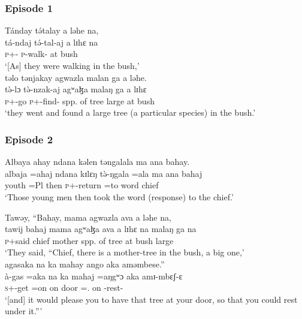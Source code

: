  \subsubsection*{Episode 1}
\ea      Tánday  t\'ətalay  a  ləhe  na,\\
\gll tá-ndaj        t\'ə-tal-aj    a   lɪhɛ     na\\
  \textsc{p}+{\IFV}-{\PRG}   \textsc{p}-walk{}-{\CL}   at  bush   {\PSP}\\
\glt ‘[As] they were walking in the bush,’\\
         
     \medskip
təlo  tənjakay  agwazla  malan  ga  a  ləhe.  \\
\gll t\`ə-lɔ           t\`ə-nzak-aj        agʷaɮa   malaŋ  ga      a    lɪhɛ\\
 \textsc{p}+{\PFV}-go   \textsc{p}+{\PFV}-find{}-{\CL}   {spp. of tree}     large   {\ADJ}  at   bush\\
\glt `they went and found a large tree (a particular species) in the bush.’
 \z
\subsubsection*{Episode 2}
\ea Albaya  ahay  ndana  kəlen  təngalala  ma  ana  bahay.  \\
\gll albaja  =ahaj  ndana  kɪlɛŋ  t\`ə-ŋgala        =ala     ma    ana      bahaj\\
          youth    =Pl       {\DEM}  then \textsc{p}+{\PFV}-return  =to  word    {\DAT} chief\\
        \glt ‘Those young men then took the word (response) to the chief.’  
 \z

\ea     Tawəy,  “Bahay,  mama  agwazla  ava  a  ləhe  na,   \\
\gll tawij bahaj mama   agʷaɮa       ava  a   lɪhɛ  na   malaŋ ga  na\\
  \textsc{p}+said  chief   mother   {spp. of tree}  {\EXT}   at   bush    {\PSP}  large     {\ADJ}  {\PSP}\\
 \glt ‘They said, “Chief, there is a mother-tree in the bush, a big one,’\\
 
 \medskip
 agasaka  na  ka  mahay  ango  aka  aməmbese.”\\
\gll 	à-gas    =aka   na  ka    mahaj   =aŋgʷɔ aka  amɪ-mbɛʃ-ɛ\\
	\textsc{s}+{\PFV}-get  =on  {\PSP}   on     door        ={\twoS}.{\POSS}  on  {\DEP}-rest-{\CL}\\
 \glt ‘[and] it would please you to have that tree at your door, so that you could rest under it.”’
 \z

